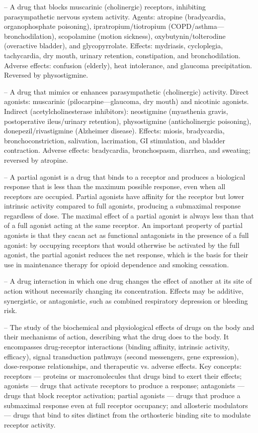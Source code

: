 -- A drug that blocks muscarinic (cholinergic) receptors, inhibiting parasympathetic nervous system activity. Agents: atropine (bradycardia, organophosphate poisoning), ipratropium/tiotropium (COPD/asthma—bronchodilation), scopolamine (motion sickness), oxybutynin/tolterodine (overactive bladder), and glycopyrrolate. Effects: mydriasis, cycloplegia, tachycardia, dry mouth, urinary retention, constipation, and bronchodilation. Adverse effects: confusion (elderly), heat intolerance, and glaucoma precipitation. Reversed by physostigmine.

-- A drug that mimics or enhances parasympathetic (cholinergic) activity. Direct agonists: muscarinic (pilocarpine—glaucoma, dry mouth) and nicotinic agonists. Indirect (acetylcholinesterase inhibitors): neostigmine (myasthenia gravis, postoperative ileus/urinary retention), physostigmine (anticholinergic poisoning), donepezil/rivastigmine (Alzheimer disease). Effects: miosis, bradycardia, bronchoconstriction, salivation, lacrimation, GI stimulation, and bladder contraction. Adverse effects: bradycardia, bronchospasm, diarrhea, and sweating; reversed by atropine.

-- A partial agonist is a drug that binds to a receptor and produces a biological response that is less than the maximum possible response, even when all receptors are occupied. Partial agonists have affinity for the receptor but lower intrinsic activity compared to full agonists, producing a submaximal response regardless of dose. The maximal effect of a partial agonist is always less than that of a full agonist acting at the same receptor. An important property of partial agonists is that they cacan act as functional antagonists in the presence of a full agonist: by occupying receptors that would otherwise be activated by the full agonist, the partial agonist reduces the net response, which is the basis for their use in maintenance therapy for opioid dependence and smoking cessation.

-- A drug interaction in which one drug changes the effect of another at its site of action without necessarily changing its concentration. Effects may be additive, synergistic, or antagonistic, such as combined respiratory depression or bleeding risk.

-- The study of the biochemical and physiological effects of drugs on the body and their mechanisms of action, describing what the drug does to the body. It encompasses drug-receptor interactions (binding affinity, intrinsic activity, efficacy), signal transduction pathways (second messengers, gene expression), dose-response relationships, and therapeutic vs. adverse effects. Key concepts: receptors — proteins or macromolecules that drugs bind to exert their effects; agonists — drugs that activate receptors to produce a response; antagonists — drugs that block receptor activation; partial agonists — drugs that produce a submaximal response even at full receptor occupancy; and allosteric modulators — drugs that bind to sites distinct from the orthosteric binding site to modulate receptor activity.

